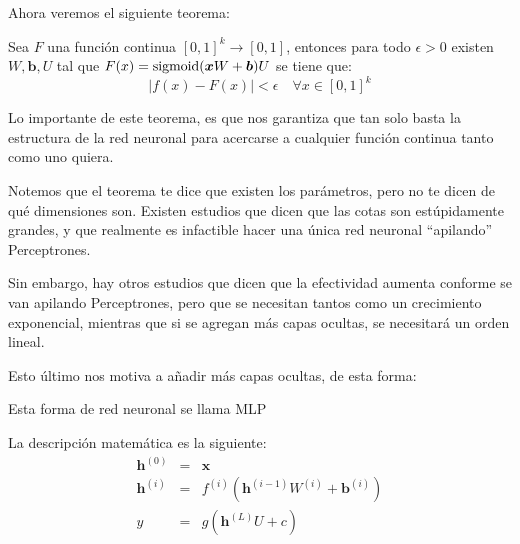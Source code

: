 Ahora veremos el siguiente teorema:

\begin{theorem}
Sea $F$ una función continua $[0, 1]^k \to [0, 1]$, entonces para todo $\epsilon>0$ existen $W, \bm{b}, U$ tal que $F(x) = \operatorname{sigmoid}(\bm{x}W + \bm{b})U$ se tiene que:
\begin{equation}
    |f(x) - F(x)|< \epsilon \quad \forall x \in [0, 1]^k
\end{equation}

\end{theorem}

Lo importante de este teorema, es que nos garantiza que tan solo basta la estructura de la red neuronal para acercarse a cualquier función continua tanto como uno quiera.

Notemos que el teorema te dice que existen los parámetros, pero no te dicen de qué dimensiones son. Existen estudios que dicen que las cotas son estúpidamente grandes, y que realmente es infactible hacer una única red neuronal ``apilando'' Perceptrones. 

Sin embargo, hay otros estudios que dicen que la efectividad aumenta conforme se van apilando Perceptrones, pero que se necesitan tantos como un crecimiento exponencial, mientras que si se agregan más capas ocultas, se necesitará un orden lineal.

Esto último nos motiva a añadir más capas ocultas, de esta forma:

Esta forma de red neuronal se llama MLP

La descripción matemática es la siguiente:
\begin{eqnarray}
\bm{h}^{(0)} &=& \bm{x}\\
\bm{h}^{(i)} &=& f^{(i)}(\bm{h}^{(i-1)} W^{(i)} + \bm{b}^{(i)})\\
y &=& g(\bm{h}^{(L)}U + c)
\end{eqnarray}